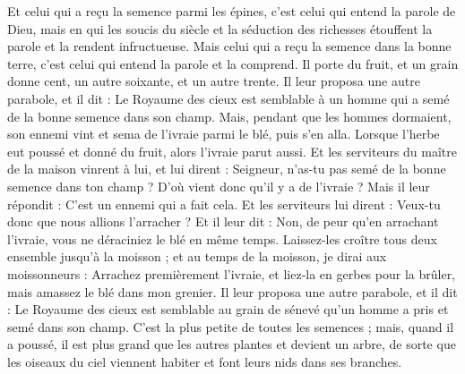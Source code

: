 \begin{multicols}{2}
Et celui qui a reçu la semence parmi les épines, c'est celui qui entend la parole de Dieu, mais en qui les soucis du siècle et la séduction des richesses étouffent la parole et la rendent infructueuse.
Mais celui qui a reçu la semence dans la bonne terre, c'est celui qui entend la parole et la comprend. Il porte du fruit, et un grain donne cent, un autre soixante, et un autre trente.
Il leur proposa une autre parabole, et il dit : Le Royaume des cieux est semblable à un homme qui a semé de la bonne semence dans son champ.
Mais, pendant que les hommes dormaient, son ennemi vint et sema de l'ivraie parmi le blé, puis s'en alla.
Lorsque l'herbe eut poussé et donné du fruit, alors l'ivraie parut aussi.
Et les serviteurs du maître de la maison vinrent à lui, et lui dirent : Seigneur, n'as-tu pas semé de la bonne semence dans ton champ ? D'où vient donc qu'il y a de l'ivraie ?
Mais il leur répondit : C'est un ennemi qui a fait cela. Et les serviteurs lui dirent : Veux-tu donc que nous allions l'arracher ?
Et il leur dit : Non, de peur qu'en arrachant l'ivraie, vous ne déraciniez le blé en même temps.
Laissez-les croître tous deux ensemble jusqu'à la moisson ; et au temps de la moisson, je dirai aux moissonneurs : Arrachez premièrement l'ivraie, et liez-la en gerbes pour la brûler, mais amassez le blé dans mon grenier.
Il leur proposa une autre parabole, et il dit : Le Royaume des cieux est semblable au grain de sénevé qu'un homme a pris et semé dans son champ.
C'est la plus petite de toutes les semences ; mais, quand il a poussé, il est plus grand que les autres plantes et devient un arbre, de sorte que les oiseaux du ciel viennent habiter et font leurs nids dans ses branches.

\end{multicols}
